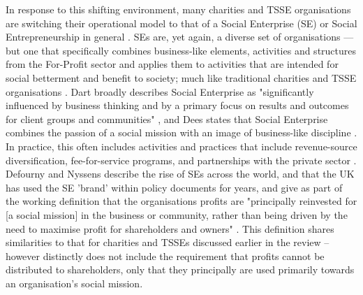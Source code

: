 In response to this shifting environment, many charities and TSSE organisations are switching their operational model to that of a Social Enterprise (SE) or Social Entrepreneurship in general \cite{borzaga_emergence_2004}. SEs are, yet again, a diverse set of organisations --- but one that specifically combines business-like elements, activities and structures from the For-Profit sector and applies them to activities that are intended for social betterment and benefit to society; much like traditional charities and TSSE organisations \cite{defourny_social_2008, doherty_diverse_2006}. Dart broadly describes Social Enterprise as "significantly influenced by business thinking and by a primary focus on results and outcomes for client groups and communities" \cite{dart_legitimacy_2004}, and Dees states that Social Enterprise combines the passion of a social mission with an image of business-like discipline \cite{dees_meaning_1998}. In practice, this often includes activities and practices that include revenue-source diversification, fee-for-service programs, and partnerships with the private sector . Defourny and Nyssens describe the rise of SEs across the world, and that the UK has used the SE 'brand' within policy documents for years, and give as part of the working definition that the organisations profits are "principally reinvested for [a social mission] in the business or community, rather than being driven by the need to maximise profit for shareholders and owners" \cite{defourny_social_2008}. This definition shares similarities to that for charities and TSSEs discussed earlier in the review -- however distinctly does not include the requirement that profits cannot be distributed to shareholders, only that they principally are used primarily towards an organisation's social mission.

